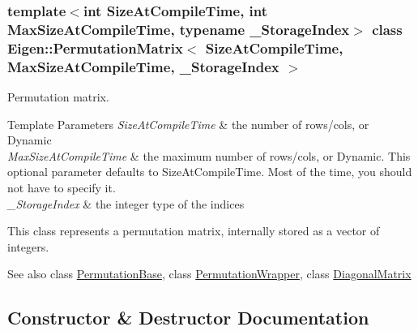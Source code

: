 \subsubsection*{template$<$int Size\+At\+Compile\+Time, int Max\+Size\+At\+Compile\+Time, typename \+\_\+\+Storage\+Index$>$\newline
class Eigen\+::\+Permutation\+Matrix$<$ Size\+At\+Compile\+Time, Max\+Size\+At\+Compile\+Time, \+\_\+\+Storage\+Index $>$}

Permutation matrix. 


\begin{DoxyTemplParams}{Template Parameters}
{\em Size\+At\+Compile\+Time} & the number of rows/cols, or Dynamic \\
\hline
{\em Max\+Size\+At\+Compile\+Time} & the maximum number of rows/cols, or Dynamic. This optional parameter defaults to Size\+At\+Compile\+Time. Most of the time, you should not have to specify it. \\
\hline
{\em \+\_\+\+Storage\+Index} & the integer type of the indices\\
\hline
\end{DoxyTemplParams}
This class represents a permutation matrix, internally stored as a vector of integers.

\begin{DoxySeeAlso}{See also}
class \mbox{\hyperlink{class_eigen_1_1_permutation_base}{Permutation\+Base}}, class \mbox{\hyperlink{class_eigen_1_1_permutation_wrapper}{Permutation\+Wrapper}}, class \mbox{\hyperlink{class_eigen_1_1_diagonal_matrix}{Diagonal\+Matrix}} 
\end{DoxySeeAlso}


\subsection{Constructor \& Destructor Documentation}
\mbox{\label{class_eigen_1_1_permutation_matrix_aea29eab1fd6a6562971db7b9c04c11aa}} 
